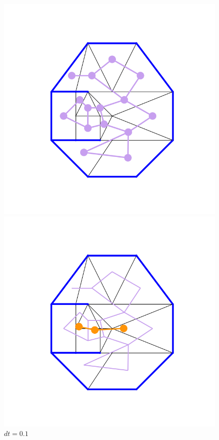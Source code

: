 \documentclass[10pt]{article}
\begin{document}
\begin{figure}[H]
    \centering
    \begin{minipage}{.5\linewidth}
        \centering
        \includegraphics[width=1\textwidth]{images/Figure_9.png}
        \caption{$dt=0.1$}
        \label{fig:prob1_6_2}
    \end{minipage}%
    \begin{minipage}{.5\linewidth}
        \centering
        \includegraphics[width=1\textwidth]{images/Figure_11.png}
        \caption{$dt=0.1$}
        \label{fig:prob1_6_2}
    \end{minipage}
\end{figure}
\end{document}
